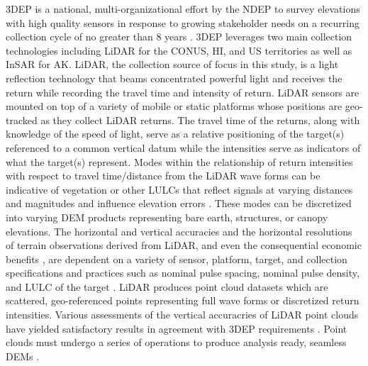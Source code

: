 \documentclass[preprint,review,12pt]{dependencies/elsarticle}
\begin{document}
\ac{3DEP} is a national, multi-organizational effort by the \ac{NDEP} to survey elevations with high quality sensors in response to growing stakeholder needs on a recurring collection cycle of no greater than 8 \acp{year} \citep{dewberry2011final,snyder2013national,sugarbaker20143d}.
\ac{3DEP} leverages two main collection technologies including \ac{LiDAR} for the \ac{CONUS}, \ac{HI}, and \ac{US} territories as well as \ac{InSAR} for \ac{AK}.
\ac{LiDAR}, the collection source of focus in this study, is a light reflection technology that beams concentrated powerful light and receives the return while recording the travel time and intensity of return. 
\ac{LiDAR} sensors are mounted on top of a variety of mobile or static platforms whose positions are geo-tracked as they collect \ac{LiDAR} returns.
The travel time of the returns, along with knowledge of the speed of light, serve as a relative positioning of the target(s) referenced to a common vertical datum while the intensities serve as indicators of what the target(s) represent.
Modes within the relationship of return intensities with respect to travel time/distance from the \ac{LiDAR} wave forms can be indicative of vegetation or other \acp{LULC} that reflect signals at varying distances and magnitudes and influence elevation errors \citep{gesch2014accuracy}.
These modes can be discretized into varying \ac{DEM} products representing bare earth, structures, or canopy elevations.
The horizontal and vertical accuracies and the horizontal resolutions of terrain observations derived from \ac{LiDAR}, and even the consequential economic benefits \citep{dewberry2011final,dewberry2022nation}, are dependent on a variety of sensor, platform, target, and collection specifications and practices such as nominal pulse spacing, nominal pulse density, and \ac{LULC} of the target \citep{heidemann2018lidar,passalacqua2015analyzing,smith2019determining,salach2018accuracy,gesch2014accuracy}.
\ac{LiDAR} produces point cloud datasets which are scattered, geo-referenced points representing full wave forms or discretized return intensities.
Various assessments of the vertical accuracries of \ac{LiDAR} point clouds have yielded satisfactory results in agreement with \ac{3DEP} requirements \citep{stoker2022accuracy,kim2022absolute,callahan2022vertical,kim2022absolute,salach2018accuracy,passalacqua2015analyzing}.
Point clouds must undergo a series of operations to produce analysis ready, seamless \acp{DEM} \citep{passalacqua2015analyzing}.
\end{document}
